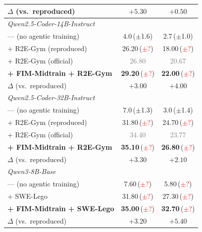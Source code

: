 \begin{table}[t]
\begin{tabular}{lcc}
\rowcolor{blue!8}
\quad\quad $\Delta$ (vs.\ reproduced)        & $+5.30$                                        & $+0.50$ \\
\midrule
\multicolumn{3}{l}{\textit{Qwen2.5-Coder-14B-Instruct}} \\
\quad --- (no agentic training)              & 4.0\,($\pm$1.6)                              & 2.7\,($\pm$1.0) \\
\quad + R2E-Gym (reproduced)                 & 26.20\,(\textcolor{red}{$\pm$?})              & 18.00\,(\textcolor{red}{$\pm$?}) \\
\quad + R2E-Gym (official)                   & \textcolor{gray}{26.80}                        & \textcolor{gray}{20.67} \\
\quad \textbf{+ FIM-Midtrain + R2E-Gym}      & \textbf{29.20}\,(\textcolor{red}{$\pm$?})     & \textbf{22.00}\,(\textcolor{red}{$\pm$?}) \\
\rowcolor{blue!8}
\quad\quad $\Delta$ (vs.\ reproduced)        & $+3.00$                                        & $+4.00$ \\
\midrule
\multicolumn{3}{l}{\textit{Qwen2.5-Coder-32B-Instruct}} \\
\quad --- (no agentic training)              & 7.0\,($\pm$1.3)                              & 3.0\,($\pm$1.4) \\
\quad + R2E-Gym (reproduced)                 & 31.80\,(\textcolor{red}{$\pm$?})              & 24.70\,(\textcolor{red}{$\pm$?}) \\
\quad + R2E-Gym (official)                   & \textcolor{gray}{34.40}                        & \textcolor{gray}{23.77} \\
\quad \textbf{+ FIM-Midtrain + R2E-Gym}      & \textbf{35.10}\,(\textcolor{red}{$\pm$?})     & \textbf{26.80}\,(\textcolor{red}{$\pm$?}) \\
\rowcolor{blue!8}
\quad\quad $\Delta$ (vs.\ reproduced)        & $+3.30$                                        & $+2.10$ \\
\midrule
\multicolumn{3}{l}{\textit{Qwen3-8B-Base}} \\
\quad --- (no agentic training)              & 7.60\,(\textcolor{red}{$\pm$?})               & 5.80\,(\textcolor{red}{$\pm$?}) \\
\quad + SWE-Lego                             & 31.80\,(\textcolor{red}{$\pm$?})              & 27.30\,(\textcolor{red}{$\pm$?}) \\
\quad \textbf{+ FIM-Midtrain + SWE-Lego}     & \textbf{35.00}\,(\textcolor{red}{$\pm$?})     & \textbf{32.70}\,(\textcolor{red}{$\pm$?}) \\
\rowcolor{blue!8}
\quad\quad $\Delta$ (vs.\ reproduced)        & $+3.20$                                        & $+5.40$ \\
\bottomrule
\end{tabular}
\end{table}


